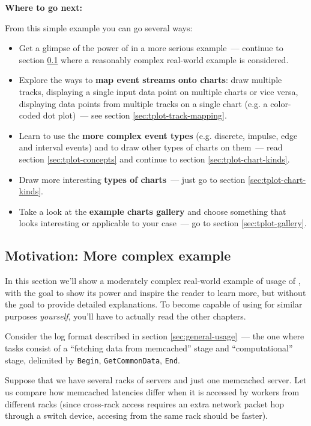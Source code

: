 \documentclass{article}
\begin{document}
\textbf{Where to go next:}

From this simple example you can go several ways:
\begin{itemize}
\item Get a glimpse of the power of \timeplot{} in a more serious example~--- continue to section \ref{sec:tplot-motivation} where a reasonably complex real-world example is considered.
\item Explore the ways to \textbf{map event streams onto charts}: draw multiple tracks, displaying a single input data point on multiple charts or vice versa, displaying data points from multiple tracks on a single chart (e.g. a color-coded dot plot)~--- see section \ref{sec:tplot-track-mapping}.
\item Learn to use the \textbf{more complex event types} (e.g. discrete, impulse, edge and interval events) and to draw other types of charts on them~--- read section \ref{sec:tplot-concepts} and continue to section \ref{sec:tplot-chart-kinds}.
\item Draw more interesting \textbf{types of charts}~--- just go to section \ref{sec:tplot-chart-kinds}.
\item Take a look at the \textbf{example charts gallery} and choose something that looks interesting or applicable to your case~--- go to section \ref{sec:tplot-gallery}.
\end{itemize}

\subsection{Motivation: More complex example}
\label{sec:tplot-motivation}
In this section we'll show a moderately complex real-world example of usage of \timeplot{}, with the goal to show its power and inspire the reader to learn more, but without the goal to provide detailed explanations. To become capable of using \timeplot{} for similar purposes \emph{yourself}, you'll have to actually read the other chapters.

Consider the log format described in section \ref{sec:general-usage}~--- the one where tasks consist of a ``fetching data from memcached'' stage and ``computational'' stage, delimited by \verb|Begin|, \verb|GetCommonData|, \verb|End|.

Suppose that we have several racks of servers and just one memcached server. Let us compare how memcached latencies differ when it is accessed by workers from different racks (since cross-rack access requires an extra network packet hop through a switch device, accesing from the same rack should be faster).
\end{document}
